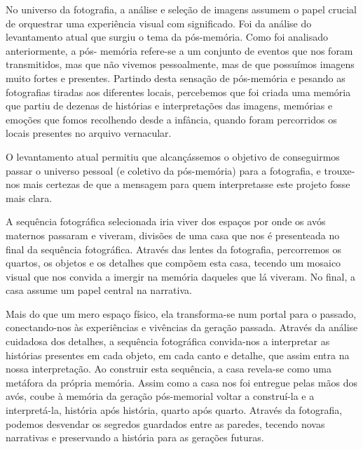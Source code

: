 \documentclass{article}
\begin{document}
 
No universo da fotografia, a análise e seleção de imagens assumem o papel crucial 
de orquestrar uma experiência visual com significado. Foi da análise do levantamento 
atual  que  surgiu  o  tema  da  pós-memória.  Como  foi  analisado  anteriormente,  a  pós-
memória refere-se a um conjunto de eventos que nos foram transmitidos, mas que não 
vivemos pessoalmente, mas de que possuímos imagens muito fortes e presentes. Partindo 
desta  sensação  de  pós-memória  e  pesando  as  fotografias  tiradas  aos  diferentes  locais, 
percebemos  que  foi  criada  uma  memória  que  partiu  de  dezenas  de  histórias  e 
interpretações das imagens, memórias e emoções que fomos recolhendo desde a infância, 
quando foram percorridos os locais presentes no arquivo vernacular. 
 
 
 
 



O  levantamento  atual  permitiu  que  alcançássemos  o  objetivo  de  conseguirmos 
passar o universo pessoal (e coletivo da pós-memória) para a fotografia, e trouxe-nos mais 
certezas de que a mensagem para quem interpretasse este projeto fosse mais clara.  
 
A  sequência  fotográfica  selecionada  iria  viver  dos  espaços  por  onde  os  avós 
maternos passaram e viveram, divisões de uma casa que nos é presenteada no final da 
sequência fotográfica. Através das lentes da fotografia, percorremos os quartos, os objetos 
e  os  detalhes  que  compõem  esta  casa,  tecendo  um  mosaico  visual  que  nos  convida  a 
imergir na memória daqueles que lá viveram. No final, a casa assume um papel central 
na narrativa.  
 
Mais do que um mero espaço físico, ela transforma-se num portal para o passado, 
conectando-nos  às  experiências  e  vivências  da  geração  passada.  Através  da  análise 
cuidadosa  dos  detalhes,  a  sequência  fotográfica  convida-nos  a  interpretar  as  histórias 
presentes em cada objeto, em cada canto e detalhe, que assim entra na nossa interpretação. 
Ao construir esta sequência, a casa revela-se como uma metáfora da própria memória. 
Assim como a casa nos foi entregue pelas mãos dos avós, coube à memória da geração 
pós-memorial  voltar  a  construí-la  e  a  interpretá-la,  história  após  história,  quarto  após 
quarto. Através da fotografia, podemos desvendar os segredos guardados entre as paredes, 
tecendo novas narrativas e preservando a história para as gerações futuras. 
 
\end{document}
